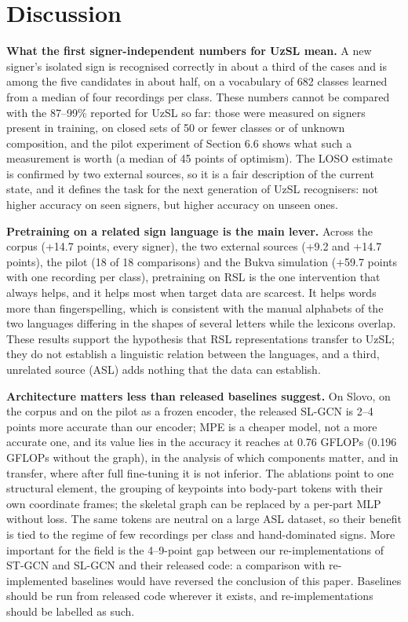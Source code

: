 \documentclass[a4paper,fleqn]{cas-dc}
\begin{document}
\hypertarget{discussion}{%
\section{Discussion}\label{discussion}}

\textbf{What the first signer-independent numbers for UzSL mean.} A new signer's isolated sign is recognised correctly in about a third of the cases and is among the five candidates in about half, on a vocabulary of 682 classes learned from a median of four recordings per class. These numbers cannot be compared with the 87--99\% reported for UzSL so far: those were measured on signers present in training, on closed sets of 50 or fewer classes or of unknown composition, and the pilot experiment of Section 6.6 shows what such a measurement is worth (a median of 45 points of optimism). The LOSO estimate is confirmed by two external sources, so it is a fair description of the current state, and it defines the task for the next generation of UzSL recognisers: not higher accuracy on seen signers, but higher accuracy on unseen ones.

\textbf{Pretraining on a related sign language is the main lever.} Across the corpus (+14.7 points, every signer), the two external sources (+9.2 and +14.7 points), the pilot (18 of 18 comparisons) and the Bukva simulation (+59.7 points with one recording per class), pretraining on RSL is the one intervention that always helps, and it helps most when target data are scarcest. It helps words more than fingerspelling, which is consistent with the manual alphabets of the two languages differing in the shapes of several letters while the lexicons overlap. These results support the hypothesis that RSL representations transfer to UzSL; they do not establish a linguistic relation between the languages, and a third, unrelated source (ASL) adds nothing that the data can establish.

\textbf{Architecture matters less than released baselines suggest.} On Slovo, on the corpus and on the pilot as a frozen encoder, the released SL-GCN is 2--4 points more accurate than our encoder; MPE is a cheaper model, not a more accurate one, and its value lies in the accuracy it reaches at 0.76 GFLOPs (0.196 GFLOPs without the graph), in the analysis of which components matter, and in transfer, where after full fine-tuning it is not inferior. The ablations point to one structural element, the grouping of keypoints into body-part tokens with their own coordinate frames; the skeletal graph can be replaced by a per-part MLP without loss. The same tokens are neutral on a large ASL dataset, so their benefit is tied to the regime of few recordings per class and hand-dominated signs. More important for the field is the 4--9-point gap between our re-implementations of ST-GCN and SL-GCN and their released code: a comparison with re-implemented baselines would have reversed the conclusion of this paper. Baselines should be run from released code wherever it exists, and re-implementations should be labelled as such.
\end{document}
